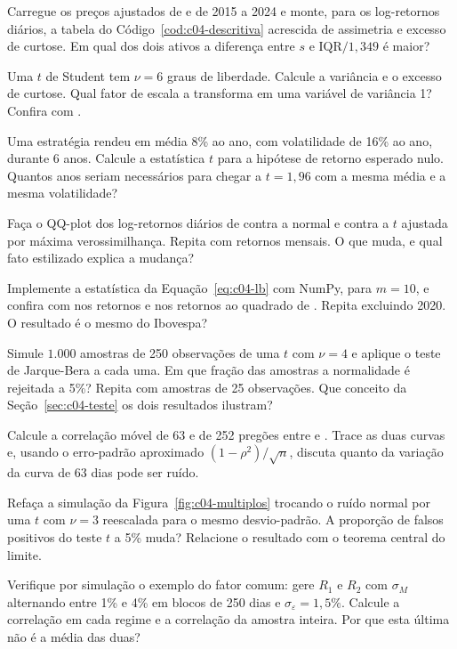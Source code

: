 \begin{exercicios}
  \item {} Carregue os preços ajustados de  e  de 2015 a 2024 e monte, para os log-retornos diários, a tabela do Código~\ref{cod:c04-descritiva} acrescida de assimetria e excesso de curtose. Em qual dos dois ativos a diferença entre $s$ e $\text{IQR}/1,349$ é maior?
  \item {} Uma $t$ de Student tem $\nu = 6$ graus de liberdade. Calcule a variância e o excesso de curtose. Qual fator de escala a transforma em uma variável de variância 1? Confira com .
  \item {} Uma estratégia rendeu em média 8\% ao ano, com volatilidade de 16\% ao ano, durante 6 anos. Calcule a estatística $t$ para a hipótese de retorno esperado nulo. Quantos anos seriam necessários para chegar a $t = 1,96$ com a mesma média e a mesma volatilidade?
  \item {} Faça o QQ-plot dos log-retornos diários de  contra a normal e contra a $t$ ajustada por máxima verossimilhança. Repita com retornos mensais. O que muda, e qual fato estilizado explica a mudança?
  \item {} Implemente a estatística da Equação~\eqref{eq:c04-lb} com NumPy, para $m = 10$, e confira com  nos retornos e nos retornos ao quadrado de . Repita excluindo 2020. O resultado é o mesmo do Ibovespa?
  \item {} Simule $1.000$ amostras de 250 observações de uma $t$ com $\nu = 4$ e aplique o teste de Jarque-Bera a cada uma. Em que fração das amostras a normalidade é rejeitada a 5\%? Repita com amostras de 25 observações. Que conceito da Seção~\ref{sec:c04-teste} os dois resultados ilustram?
  \item {} Calcule a correlação móvel de 63 e de 252 pregões entre  e . Trace as duas curvas e, usando o erro-padrão aproximado $(1-\rho^2)/\sqrt{n}$, discuta quanto da variação da curva de 63 dias pode ser ruído.
  \item {} Refaça a simulação da Figura~\ref{fig:c04-multiplos} trocando o ruído normal por uma $t$ com $\nu = 3$ reescalada para o mesmo desvio-padrão. A proporção de falsos positivos do teste $t$ a 5\% muda? Relacione o resultado com o teorema central do limite.
  \item {} Verifique por simulação o exemplo do fator comum: gere $R_1$ e $R_2$ com $\sigma_M$ alternando entre 1\% e 4\% em blocos de 250 dias e $\sigma_\varepsilon = 1,5\%$. Calcule a correlação em cada regime e a correlação da amostra inteira. Por que esta última não é a média das duas?
\end{exercicios}

